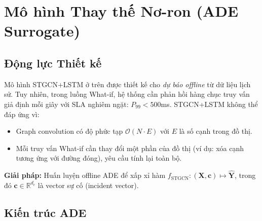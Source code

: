 \section{Mô hình Thay thế Nơ-ron (ADE Surrogate)}

\subsection{Động lực Thiết kế}

Mô hình STGCN+LSTM ở trên được thiết kế cho \textit{dự báo offline} từ dữ liệu lịch sử. Tuy nhiên, trong luồng What-if, hệ thống cần phản hồi hàng chục truy vấn giả định mỗi giây với SLA nghiêm ngặt: $P_{99} < 500$ms. STGCN+LSTM không thể đáp ứng vì:

\begin{itemize}[itemsep=3pt]
  \item Graph convolution có độ phức tạp $\mathcal{O}(N \cdot E)$ với $E$ là số cạnh trong đồ thị.
  \item Mỗi truy vấn What-if cần thay đổi một phần của đồ thị (ví dụ: xóa cạnh tương ứng với đường đóng), yêu cầu tính lại toàn bộ.
\end{itemize}

\textbf{Giải pháp:} Huấn luyện offline ADE để xấp xỉ hàm $f_{\text{STGCN}}: (\mathbf{X}, \mathbf{c}) \mapsto \hat{\mathbf{Y}}$, trong đó $\mathbf{c} \in \mathbb{R}^{d_c}$ là vector sự cố (incident vector).

\subsection{Kiến trúc ADE}

